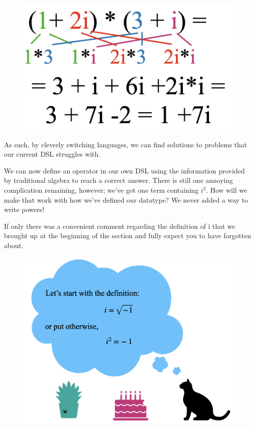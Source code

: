 \begin{figure}[h!]
    \centering
    \includegraphics[scale= 0.3]{mult.png}
    \caption{}
    \label{mult}
\end{figure}

As such, by cleverly switching languages, we can find solutions to problems that our current DSL struggles with.

We can now define an operator in our own DSL using the information provided by traditional algebra to reach a correct answer. There is still one annoying complication remaining, however; we've got one term containing $i^2$. How will we make that work with how we've defined our datatype? We never added a way to write powers!

If only there was a convenient comment regarding the definition of i that we brought up at the beginning of the section and fully expect you to have forgotten about.

\begin{figure}[h!]
    \centering
    \includegraphics[scale= 0.4]{catretrospective.png}
    \caption{}
    \label{catretro}
\end{figure}


